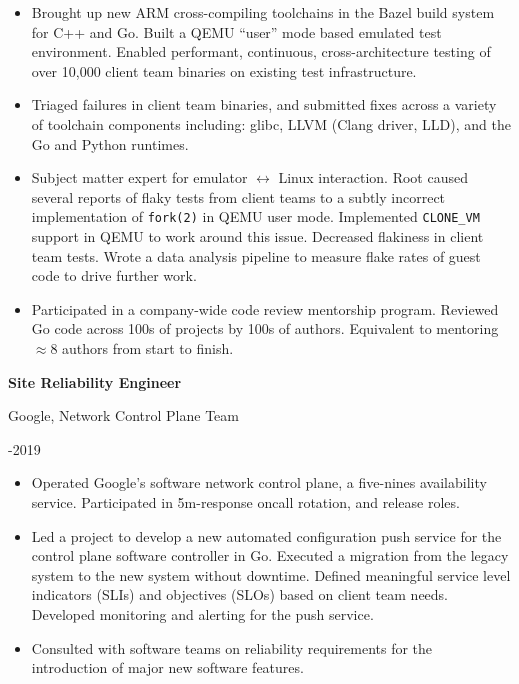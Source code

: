 \documentclass[10pt]{article}
\newcommand{\triline}[3]{%
    \parbox[t][][t]{.4\linewidth}{ #1 }%
    \parbox[t][][t]{.4\linewidth}{ #2 }%
    \parbox[t][][t]{.2\linewidth}{\raggedleft #3 }%
    \vspace{1ex}
}
\newlength{\listpostvertical}
\begin{document}
\begin{itemize}[nosep]
\item Brought up new ARM cross-compiling toolchains in the Bazel build system
      for C++ and Go. Built a QEMU ``user'' mode based emulated test environment.
      Enabled performant, continuous, cross-architecture testing of over
      10,000 client team binaries on existing test infrastructure.
\item Triaged failures in client team binaries, and submitted fixes  across a
      variety of toolchain components including: glibc, LLVM (Clang driver,
      LLD), and the Go and Python runtimes.
\item Subject matter expert for emulator $\leftrightarrow$ Linux interaction.
      Root caused several reports of flaky tests from client teams to a subtly
      incorrect implementation of \verb|fork(2)| in QEMU user mode. Implemented
      \verb|CLONE_VM| support in QEMU to work around this issue. Decreased
      flakiness in client team tests. Wrote a data analysis pipeline to measure
      flake rates of guest code to drive further work.
\item Participated in a company-wide code review mentorship program. Reviewed 
      Go code across 100s of projects by 100s of authors. Equivalent to
      mentoring $\approx 8$ authors from start to finish.
\end{itemize}
\vspace{\listpostvertical}

\triline{\textbf{Site Reliability Engineer}}{Google, Network Control Plane Team}{2017-2019}

\begin{itemize}[nosep]
\item Operated Google's software network control plane, a five-nines
      availability service. Participated in 5m-response oncall rotation, and
      release roles.
\item Led a project to develop a new automated configuration push service for
      the control plane software controller in Go. Executed a migration from
      the legacy system to the new system without downtime. Defined meaningful
      service level indicators (SLIs) and objectives (SLOs) based on client
      team needs. Developed monitoring and alerting for the push service.
\item Consulted with software teams on reliability requirements for the
      introduction of major new software features.
\end{itemize}
\vspace{\listpostvertical}
\end{document}
